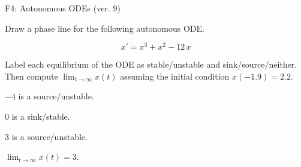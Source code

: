 \begin{exercise}
  \begin{exerciseTitle}F4: Autonomous ODEs (ver. 9)\end{exerciseTitle}
  \begin{exerciseStatement}
    

      Draw a phase line for the following 
      autonomous ODE.
    

    
\[x'= x^{3} + x^{2} - 12 \, x\]

    

      Label each equilibrium of the ODE
      as stable/unstable and sink/source/neither.
      Then compute \(\lim_{t\to\infty}x(t)\)
      assuming the initial condition
      \(x( -1.9 )= 2.2\).
    

  \end{exerciseStatement}
  \begin{exerciseAnswer}
    

      \(-4\) is a source/unstable.
      
        \(0\) is a sink/stable.
      
      \(3\) is a source/unstable.
    

    

      \(\lim_{t\to\infty}x(t)=3\).
    

  \end{exerciseAnswer}
\end{exercise}